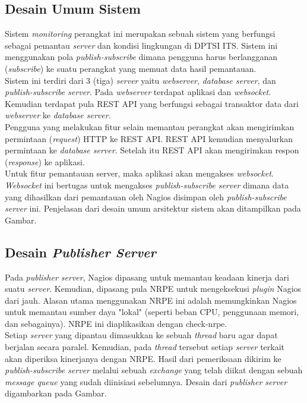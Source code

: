 \subsection{Desain Umum Sistem}
\tab Sistem \textit{monitoring} perangkat ini merupakan sebuah sistem yang berfungsi sebagai pemantau \textit{server} dan kondisi lingkungan di DPTSI ITS. Sistem ini menggunakan pola \textit{publish-subscribe} dimana pengguna harus berlangganan (\textit{subscribe}) ke suatu perangkat yang memuat data hasil pemantauan. \\
\tab Sistem ini terdiri dari 3 (tiga) \textit{server} yaitu \textit{webserver}, \textit{database server}, dan \textit{publish-subscribe server}. Pada \textit{webserver} terdapat aplikasi dan \textit{websocket}. Kemudian terdapat pula REST API yang berfungsi sebagai transaktor data dari \textit{webserver} ke \textit{database server}. \\
\tab Pengguna yang melakukan fitur selain memantau perangkat akan mengirimkan permintaan (\textit{request}) HTTP ke REST API. REST API kemudian menyalurkan permintaan ke \textit{database server}. Setelah itu REST API akan mengirimkan respon (\textit{response}) ke aplikasi. \\
\tab Untuk fitur pemantauan server, maka aplikasi akan mengakses \textit{websocket}. \textit{Websocket} ini bertugas untuk mengakses \textit{publish-subscribe server} dimana data yang dihasilkan dari pemantauan oleh Nagios disimpan oleh \textit{publish-subscribe server} ini. Penjelasan dari desain umum arsitektur sistem akan ditampilkan pada Gambar. \\


\subsection{Desain \textit{Publisher Server}}
\tab Pada \textit{publisher server}, Nagios dipasang untuk memantau keadaan kinerja dari suatu \textit{server}. Kemudian, dipasang pula NRPE untuk mengeksekusi \textit{plugin} Nagios dari jauh. Alasan utama menggunakan NRPE ini adalah memungkinkan Nagios untuk memantau sumber daya "lokal" (seperti beban CPU, penggunaan memori, dan sebagainya). NRPE ini diaplikasikan dengan check-nrpe. \\
\tab Setiap \textit{server} yang dipantau dimasukkan ke sebuah \textit{thread} baru agar dapat berjalan secara paralel. Kemudian, pada \textit{thread} tersebut setiap \textit{server} terkait akan diperiksa kinerjanya dengan NRPE. Hasil dari pemeriksaan dikirim ke \textit{publish-subscribe server} melalui sebuah \textit{exchange} yang telah diikat dengan sebuah \textit{message queue} yang sudah diinisiasi sebelumnya. Desain dari \textit{publisher server} digambarkan pada Gambar. \\


